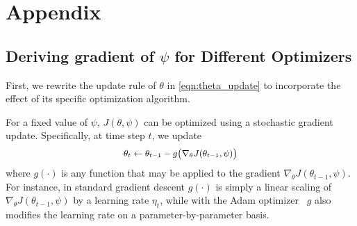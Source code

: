 \section{\label{app} Appendix}

\subsection{\label{app:grad_of_optimizers}Deriving gradient of $\psi$ for Different Optimizers}
First, we rewrite the update rule of $\theta$ in \autoref{eqn:theta_update} to incorporate the effect of its specific optimization algorithm.

For a fixed value of $\psi$, $J(\theta, \psi)$ can be optimized using a stochastic gradient update. Specifically, at time step $t$, we update
\begin{equation}
  \label{eqn:theta_update_rule}
   \small
  \begin{aligned}
    \theta_t \leftarrow \theta_{t-1} - g\big( \nabla_\theta J(\theta_{t-1}, \psi) \big)
  \end{aligned}
\end{equation}
where $g(\cdot)$ is any function that may be applied to the gradient $\nabla_\theta J(\theta_{t-1}, \psi)$. For instance, in standard gradient descent $g(\cdot)$ is simply a linear scaling of $\nabla_\theta J(\theta_{t-1}, \psi)$ by a learning rate $\eta_t$, while with the Adam optimizer~\citep{adam} $g$ also modifies the learning rate on a parameter-by-parameter basis.

